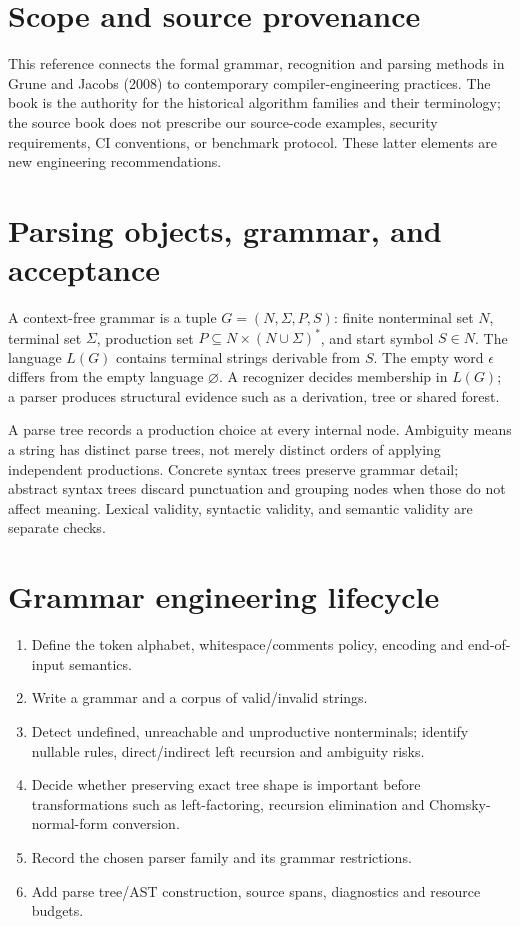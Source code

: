 \documentclass[11pt,letterpaper]{article}
\begin{document}
\makedoctitle\makedocsummary
\tableofcontents\clearpage

\section{Scope and source provenance}
This reference connects the formal grammar, recognition and parsing methods in Grune and Jacobs (2008) to contemporary compiler-engineering practices. The book is the authority for the historical algorithm families and their terminology; the source book does not prescribe our source-code examples, security requirements, CI conventions, or benchmark protocol. These latter elements are new engineering recommendations.
\section{Parsing objects, grammar, and acceptance}
A context-free grammar is a tuple $G=(N,\Sigma,P,S)$: finite nonterminal set $N$, terminal set $\Sigma$, production set $P\subseteq N\times(N\cup\Sigma)^*$, and start symbol $S\in N$. The language $L(G)$ contains terminal strings derivable from $S$. The empty word $\epsilon$ differs from the empty language $\varnothing$. A recognizer decides membership in $L(G)$; a parser produces structural evidence such as a derivation, tree or shared forest.\par
A parse tree records a production choice at every internal node. Ambiguity means a string has distinct parse trees, not merely distinct orders of applying independent productions. Concrete syntax trees preserve grammar detail; abstract syntax trees discard punctuation and grouping nodes when those do not affect meaning. Lexical validity, syntactic validity, and semantic validity are separate checks.
\section{Grammar engineering lifecycle}
\begin{enumerate}\item Define the token alphabet, whitespace/comments policy, encoding and end-of-input semantics.\item Write a grammar and a corpus of valid/invalid strings.\item Detect undefined, unreachable and unproductive nonterminals; identify nullable rules, direct/indirect left recursion and ambiguity risks.\item Decide whether preserving exact tree shape is important before transformations such as left-factoring, recursion elimination and Chomsky-normal-form conversion.\item Record the chosen parser family and its grammar restrictions.\item Add parse tree/AST construction, source spans, diagnostics and resource budgets.\end{enumerate}
\end{document}
